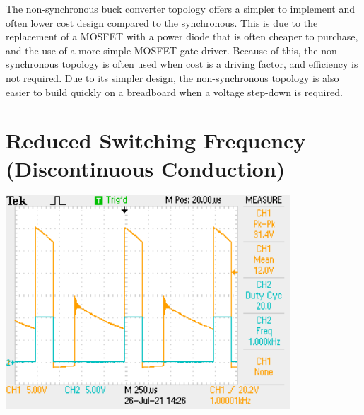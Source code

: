 \documentclass[a4paper,11pt]{article}
\begin{document}
\begin{preview}
The non-synchronous buck converter topology offers a simpler to implement and often lower cost design compared to the synchronous. This is due to the replacement of a MOSFET with a power diode that is often cheaper to purchase, and the use of a more simple MOSFET gate driver. Because of this, the non-synchronous topology is often used when cost is a driving factor, and efficiency is not required. Due to its simpler design, the non-synchronous topology is also easier to build quickly on a breadboard when a voltage step-down is required. 

\section{Reduced Switching Frequency (Discontinuous Conduction)}
  
  \begin{center}
    \includegraphics[width=0.8\textwidth]{discontinuious_opperation.png}
  \end{center}



\end{preview}
\end{document}
